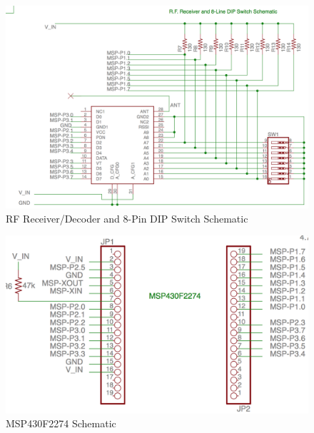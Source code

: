 \documentclass[letterpaper,10pt]{article}
\begin{document}
\begin{spacing}{1.15}
\begin{figure} [H]
	\centering
	\includegraphics[scale=0.5]{receiver-dip-schematic.png}
	\caption{RF Receiver/Decoder and 8-Pin DIP Switch Schematic\label{fig:rf-receiver-decoder-schematic}}
\end{figure}

\begin{figure} [H]
	\centering
	\includegraphics[scale=0.5]{msp-schematic.png}
	\caption{MSP430F2274 Schematic\label{fig:msp-schematic}}
\end{figure}



\end{spacing}
\end{document}
